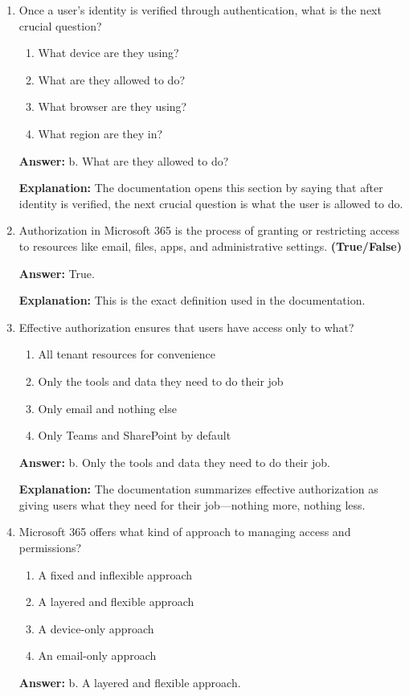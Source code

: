 \documentclass[10pt]{article}
\begin{document}
\begin{enumerate}[leftmargin=*]

\item Once a user’s identity is verified through authentication, what is the next crucial question?
\begin{enumerate}[label=\alph*., leftmargin=1.5em]
\item What device are they using?
\item What are they allowed to do?
\item What browser are they using?
\item What region are they in?
\end{enumerate}
\textbf{Answer:} b. What are they allowed to do?

\textbf{Explanation:} The documentation opens this section by saying that after identity is verified, the next crucial question is what the user is allowed to do.

\item Authorization in Microsoft 365 is the process of granting or restricting access to resources like email, files, apps, and administrative settings. \textbf{(True/False)}

\textbf{Answer:} True.

\textbf{Explanation:} This is the exact definition used in the documentation.

\item Effective authorization ensures that users have access only to what?
\begin{enumerate}[label=\alph*., leftmargin=1.5em]
\item All tenant resources for convenience
\item Only the tools and data they need to do their job
\item Only email and nothing else
\item Only Teams and SharePoint by default
\end{enumerate}
\textbf{Answer:} b. Only the tools and data they need to do their job.

\textbf{Explanation:} The documentation summarizes effective authorization as giving users what they need for their job—nothing more, nothing less.

\item Microsoft 365 offers what kind of approach to managing access and permissions?
\begin{enumerate}[label=\alph*., leftmargin=1.5em]
\item A fixed and inflexible approach
\item A layered and flexible approach
\item A device-only approach
\item An email-only approach
\end{enumerate}
\textbf{Answer:} b. A layered and flexible approach.


\end{enumerate}
\end{document}
